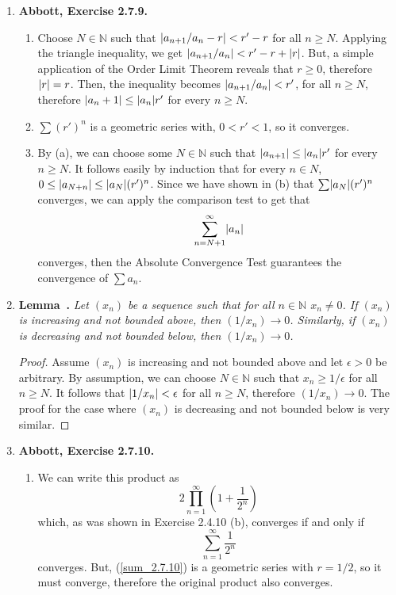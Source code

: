 \documentclass{article}
\newcounter{lemmaCounter}
\newenvironment{shortlemma}[1]{\refstepcounter{lemmaCounter}
\label{#1}\textbf{Lemma~\thelemmaCounter.}\em}
\DeclarePairedDelimiter\abs{\lvert}{\rvert}
\newcommand{\N}{\mathbb{N}}
\newcommand{\ra}{\rightarrow}
\newcommand{\exc}[2][Abbott]{\item \textbf{#1, Exercise #2.}}
\newcommand{\lep}[1][L]{#1et $\epsilon > 0$ be arbitrary}
\begin{document}
\begin{enumerate}
    \exc{2.7.9}
    \begin{enumerate}
        \item Choose $N \in \N$ such that $\abs{a_{n+1}/a_n - r} < r'- r$ for all $n \geq N$. Applying the triangle inequality, we get $\abs{a_{n+1}/a_n} < r' -r + \abs{r}$. But, a simple application of the Order Limit Theorem reveals that $r \geq 0$, therefore $\abs{r}=r$. Then, the inequality becomes $\abs{a_{n+1}/a_n} < r'$, for all $n \geq N$, therefore $\abs{a_n+1} \leq \abs{a_n} r'$ for every $n \geq N$.
        
        \item $\sum (r')^n$ is a geometric series with, $0 < r' < 1$, so it converges.
        
        \item By (a), we can choose some $N \in \N$ such that $\abs{a_{n+1}} \leq \abs{a_n} r'$ for every $n \geq N$. It follows easily by induction that for every $n \in N$, $0 \leq \abs{a_{N+n}} \leq \abs{a_N} (r')^n$. Since we have shown in (b) that $\sum \abs{a_N} (r')^n$ converges, we can apply the comparison test to get that 
        \begin{equation*}
            \sum_{n=N+1}^\infty \abs{a_n}
        \end{equation*} converges, then the Absolute Convergence Test guarantees the convergence of $\sum a_n$.
    \end{enumerate} 
    
    \item \begin{shortlemma}{lem_1OverInfinityIsZero}
        Let $(x_n)$ be a sequence such that for all $n \in \N$ $x_n \neq 0$.
        If $(x_n)$ is increasing and not bounded above, then $(1/x_n) \ra 0$. Similarly, if $(x_n)$ is decreasing and not bounded below, then $(1/x_n) \ra 0$.
    \end{shortlemma}
    \begin{proof}
        Assume $(x_n)$ is increasing and not bounded above and \lep[l]. By assumption, we can choose $N \in \N$ such that $x_n \geq 1/\epsilon$ for all $n \geq N$. It follows that $\abs{1/x_n} < \epsilon$ for all $n \geq N$, therefore $(1/x_n) \ra 0$. The proof for the case where $(x_n)$ is decreasing and not bounded below is very similar.
    \end{proof}
    
    \exc{2.7.10}
    \begin{enumerate}
        \item We can write this product as 
        \begin{equation*}
            2  \prod_{n=1}^\infty (1 + \frac{1}{2^n})
        \end{equation*} which, as was shown in Exercise 2.4.10 (b), converges if and only if 
        \begin{equation} \label{sum_2.7.10}
            \sum_{n=1}^\infty \frac{1}{2^n}
        \end{equation} converges. But, (\ref{sum_2.7.10}) is a geometric series with $r = 1/2$, so it must converge, therefore the original product also converges.
        

\end{enumerate}
\end{enumerate}
\end{document}
